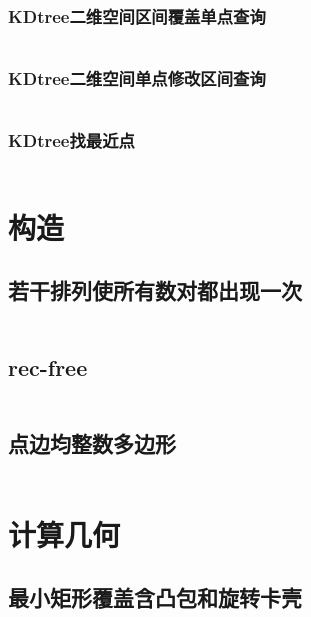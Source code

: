 \documentclass{article}
\begin{document}
\subsubsection{KDtree二维空间区间覆盖单点查询}
\inputminted[breaklines]{c++}{../数据结构/KDtree二维空间区间覆盖单点查询.cpp}

\subsubsection{KDtree二维空间单点修改区间查询}
\inputminted[breaklines]{c++}{../数据结构/KDtree二维空间单点修改区间查询.cpp}

\subsubsection{KDtree找最近点}
\inputminted[breaklines]{c++}{../数据结构/KDtree找最近点.cpp}

\newpage
\section{构造}
\subsection{若干排列使所有数对都出现一次}
\inputminted[breaklines]{c++}{../构造/若干排列使所有数对都出现一次.cpp}

\subsection{rec-free}
\inputminted[breaklines]{c++}{../构造/rec-free.cpp}

\subsection{点边均整数多边形}
\inputminted[breaklines]{c++}{../构造/点边均整数多边形.cpp}

\newpage
\section{计算几何}
\subsection{最小矩形覆盖含凸包和旋转卡壳}
\inputminted[breaklines]{c++}{../计算几何/最小矩形覆盖含凸包和旋转卡壳.cpp}

\newpage
\end{document}
